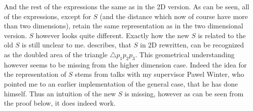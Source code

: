 %
And the rest of the expressions the same as in the 2D version. As can be seen,
all of the expressions, except for $S$ (and the distance which now of course
have more than two dimensions), retain the same representation as in the two
dimensional version. $S$ however looks quite different. Exactly how the new $S$
is related to the old $S$ is still unclear to me. \textcite{uteshev2014}
describes, that $S$ in 2D rewritten, can be recognized as the doubled area of
the triangle $\triangle p_1 p_2 p_3$. This geometrical understanding however
seems to be missing from the higher dimension case. Indeed the idea for the
representation of $S$ stems from talks with my supervisor Pawel Winter, who
pointed me to an earlier implementation of the general case, that he has done
himself. Thus an intuition of the new $S$ is missing, however as can be seen
from the proof below, it does indeed work.
%

